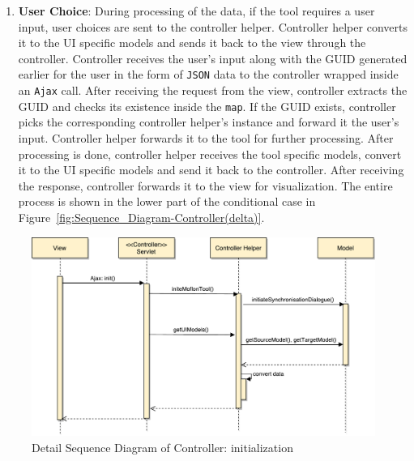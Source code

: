 \begin{enumerate}
	\item {\textbf{User Choice}: During processing of the data, if the tool requires a user input, user choices are sent to the controller helper. Controller helper converts it to the UI specific models and sends it back to the view through the controller. Controller receives the user's input along with the GUID generated earlier for the user in the form of \texttt{JSON} data to the controller wrapped inside an \texttt{Ajax} call. After receiving the request from the view, controller extracts the GUID and checks its existence inside the \texttt{map}. If the GUID exists, controller picks the corresponding controller helper's instance and forward it the user's input. Controller helper forwards it to the tool for further processing. After processing is done, controller helper receives the tool specific models, convert it to the UI specific models and send it back to the controller. After receiving the response, controller forwards it to the view for visualization. The entire process is shown in the lower part of the conditional case in Figure~\ref{fig:Sequence_Diagram-Controller(delta)}.}
\end{enumerate}

\begin{figure}
	\includegraphics[width=1\textwidth]{figures/Sequence_Diagram-Controller(init)}
	\caption{Detail Sequence Diagram of Controller: initialization}
	\label{fig:Sequence_Diagram-Controller(init)}
\end{figure}

